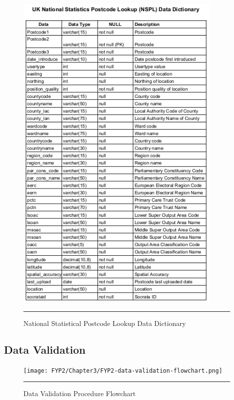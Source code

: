 \begin{figure}[H]
	\centering
	\includegraphics[width=0.9\textwidth]{Data-Dictionary/NSPL-data-dictionary.png}
	\rule{35em}{0.5pt}
	\caption[National Statistical Postcode Lookup Data Dictionary]{National Statistical Postcode Lookup Data Dictionary}
\end{figure}

\pagebreak

\subsection{Data Validation}

\begin{figure}[H]
	\centering
	\texttt{[image: FYP2/Chapter3/FYP2-data-validation-flowchart.png]}
	\rule{35em}{0.7pt}
	\caption[Data Validation Procedure Flowchart]{Data Validation Procedure Flowchart}
\end{figure}

